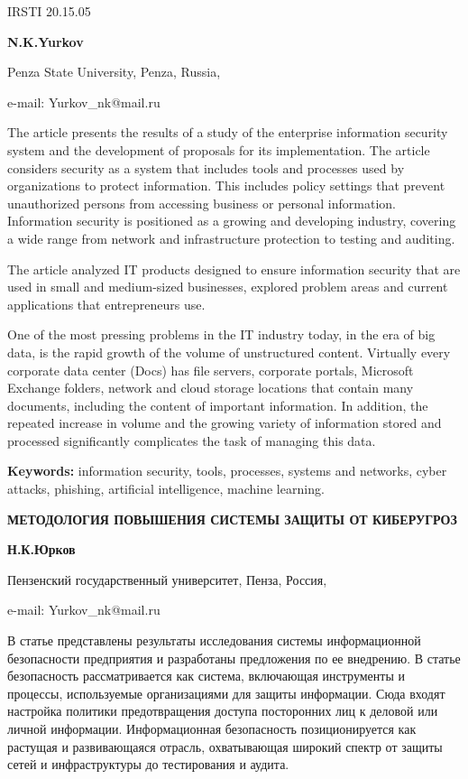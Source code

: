 IRSTI 20.15.05


\begin{center}
{\bfseries N.K.Yurkov}

Penza State University, Penza, Russia,

e-mail: Yurkov\_nk@mail.ru
\end{center}

The article presents the results of a study of the enterprise
information security system and the development of proposals for its
implementation. The article considers security as a system that includes
tools and processes used by organizations to protect information. This
includes policy settings that prevent unauthorized persons from
accessing business or personal information. Information security is
positioned as a growing and developing industry, covering a wide range
from network and infrastructure protection to testing and auditing.

The article analyzed IT products designed to ensure information security
that are used in small and medium-sized businesses, explored problem
areas and current applications that entrepreneurs use.

One of the most pressing problems in the IT industry today, in the era
of big data, is the rapid growth of the volume of unstructured content.
Virtually every corporate data center (Docs) has file servers, corporate
portals, Microsoft Exchange folders, network and cloud storage locations
that contain many documents, including the content of important
information. In addition, the repeated increase in volume and the
growing variety of information stored and processed significantly
complicates the task of managing this data.

{\bfseries Keywords:} information security, tools, processes, systems and
networks, cyber attacks, phishing, artificial intelligence, machine
learning.

\begin{center}
{\large\bfseries МЕТОДОЛОГИЯ ПОВЫШЕНИЯ СИСТЕМЫ ЗАЩИТЫ ОТ КИБЕРУГРОЗ}

{\bfseries Н.К.Юрков}

Пензенский государственный университет, Пенза, Россия,

e-mail: Yurkov\_nk@mail.ru
\end{center}

В статье представлены результаты исследования системы информационной
безопасности предприятия и разработаны предложения по ее внедрению. В
статье безопасность рассматривается как система, включающая инструменты
и процессы, используемые организациями для защиты информации. Сюда
входят настройка политики предотвращения доступа посторонних лиц к
деловой или личной информации. Информационная безопасность
позиционируется как растущая и развивающаяся отрасль, охватывающая
широкий спектр от защиты сетей и инфраструктуры до тестирования и
аудита.

